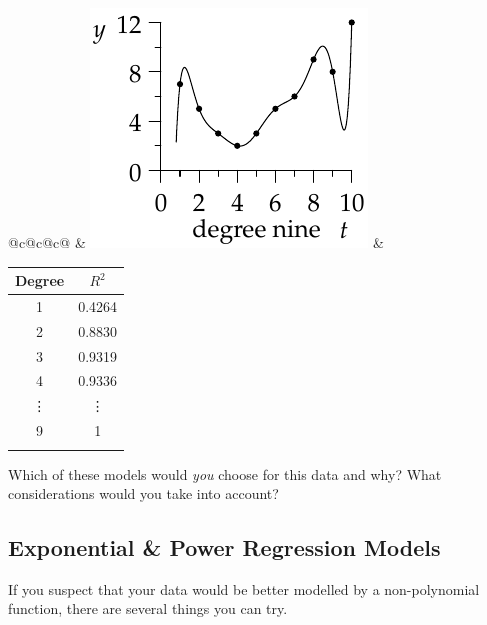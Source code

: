 \begin{exercises}{}{}
\begin{enumerate}
\begin{enumerate}
\begin{center}
\begin{tabular}[t]{@{}c@{\quad}c@{\quad}c@{}}
	    		&
	    		\includegraphics{midterm-reg9}
	    		&
	    		\begin{tabular}[b]{c|c}
		    		Degree&$R^2$\\\hline
		    		1&0.4264\\
		    		2&0.8830\\
		    		3&0.9319\\
		    		4&0.9336\\
		    		\vdots&\vdots\\
		    		9&1\\
		    		\multicolumn{2}{c}{}
	    		\end{tabular}
	    	\end{tabular}
	    \end{center}
	
	    Which of these models would \emph{you} choose for this data and why? What considerations would you take into account?  
		\end{enumerate}
	\end{enumerate}
\end{exercises}


\clearpage


\subsection{Exponential \& Power Regression Models}

If you suspect that your data would be better modelled by a non-polynomial function, there are several things you can try.\medbreak

